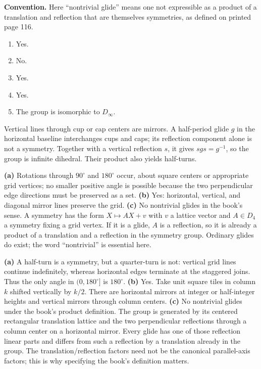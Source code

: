 \textbf{Convention.} Here ``nontrivial glide'' means one not expressible as a product of a translation and reflection that are themselves symmetries, as defined on printed page 116.
\begin{enumerate}[label=(\alph*)]\item Yes.\item No.\item Yes.\item Yes.\item The group is isomorphic to $D_\infty$.\end{enumerate}Vertical lines through cup or cap centers are mirrors. A half-period glide $g$ in the horizontal baseline interchanges cups and caps; its reflection component alone is not a symmetry. Together with a vertical reflection $s$, it gives $sgs=g^{-1}$, so the group is infinite dihedral. Their product also yields half-turns.

\textbf{(a)} Rotations through $90^\circ$ and $180^\circ$ occur, about square centers or appropriate grid vertices; no smaller positive angle is possible because the two perpendicular edge directions must be preserved as a set. \textbf{(b)} Yes: horizontal, vertical, and diagonal mirror lines preserve the grid. \textbf{(c)} No nontrivial glides in the book's sense. A symmetry has the form $X\mapsto AX+v$ with $v$ a lattice vector and $A\in D_4$ a symmetry fixing a grid vertex. If it is a glide, $A$ is a reflection, so it is already a product of a translation and a reflection in the symmetry group. Ordinary glides do exist; the word ``nontrivial'' is essential here.

\textbf{(a)} A half-turn is a symmetry, but a quarter-turn is not: vertical grid lines continue indefinitely, whereas horizontal edges terminate at the staggered joins. Thus the only angle in $(0,180^\circ]$ is $180^\circ$. \textbf{(b)} Yes. Take unit square tiles in column $k$ shifted vertically by $k/2$. There are horizontal mirrors at integer or half-integer heights and vertical mirrors through column centers. \textbf{(c)} No nontrivial glides under the book's product definition. The group is generated by its centered rectangular translation lattice and the two perpendicular reflections through a column center on a horizontal mirror. Every glide has one of those reflection linear parts and differs from such a reflection by a translation already in the group. The translation/reflection factors need not be the canonical parallel-axis factors; this is why specifying the book's definition matters.

